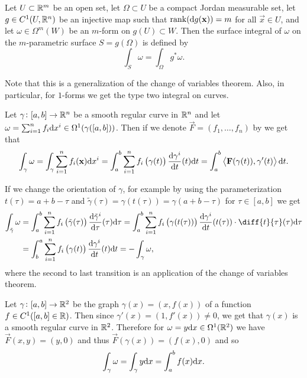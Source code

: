 \documentclass[11pt,a4paper]{article}
\begin{document}
\begin{definition}
  \label{def:surface-integral-m-form}
  Let $U \subset \mathbb{R}^m$ be an open set,
  let $\Omega \subset U$ be a compact Jordan measurable set,
  let $g \in C^1(U,\mathbb{R}^n)$ be an injective map such that $\operatorname{rank}(\mathrm{d} g(\boldsymbol{\mathbf{x}})) = m$ for all $\vec x \in U$,
  and let $\omega \in \Omega^m(W)$ be an $m$-form on
  $g(U) \subset W$.
  Then the surface integral of $\omega$ on the $m$-parametric
  surface $S = g(\Omega)$ is defined by
  \[
    \int_{S} \omega =
    \int_{\Omega} g^*\omega.
  \]
\end{definition}
\begin{remark}
  Note
  that this is a generalization of the change of variables theorem.
  Also, in particular, for $1$-forms we get the type two integral
  on curves.
\end{remark}
\begin{example}
  Let $\gamma \colon [a,b] \to \mathbb{R}^n$ be a smooth regular curve
  in $\mathbb{R}^n$ and let
  $\omega = \sum_{i=1}^{n} f_i \dx^i \in \Omega^1(\gamma([a,b]))$.
  Then if we denote $\vec F = (f_1,\dots,f_n)$
  by  we get that
  \[
    \int_{\gamma} \omega =
    \int_{\gamma} \sum_{i=1}^{n} f_i(\vec x) \dx^i =
    \int_{a}^{b}
    \sum_{i=1}^{n} f_i\del{\gamma(t)} \frac{\dif \gamma^i}{\dt}(t) \dt =
    \int_{a}^{b} \ip{\vec F(\gamma(t))}{\gamma'(t)} \dt.
  \]
\end{example}
\begin{remark}
  If we change the orientation of $\gamma$,
  for example by using the parameterization $t(\tau) = a + b - \tau$
  and $\tilde \gamma(\tau) = \gamma(t(\tau)) = \gamma(a + b - \tau)$
  for $\tau \in [a,b]$ we get
  \begin{align*}
    \int_{\tilde \gamma} \omega &=
    \int_{a}^{b} \sum_{i=1}^{n}
    f_i\del{\tilde \gamma(\tau)} \frac{\dif \tilde \gamma^i}{\dif \tau}(\tau) \dif \tau =
    \int_{a}^{b} \sum_{i=1}^{n}
    f_i\del{\gamma(t(\tau))} \frac{\dif \gamma^i}{\dt}(t(\tau)) \cdot
    \diff{t}{\tau}(\tau) \dif \tau \\ &=
    \int_{b}^{a}
    \sum_{i=1}^{n} f_i\del{\gamma(t)} \frac{\dif \gamma^i}{\dt}(t) \dt =
    -\int_{\gamma} \omega,
  \end{align*}
  where the second to last transition is an application of the 
  change of variables theorem.
\end{remark}

\begin{example}
  Let $\gamma \colon [a,b] \to \mathbb{R}^2$ be the graph
  $\gamma(x) = (x,f(x))$ of a function $f \in C^1([a,b] \in \mathbb{R})$.
  Then since $\gamma'(x) = (1,f'(x)) \neq 0$, we get that
  $\gamma(x)$ is a smooth regular curve in $\mathbb{R}^2$.
  Therefore for $\omega = y \dx \in \Omega^1(\R^2)$ we have
  $\vec F(x,y) = (y,0)$ and thus $\vec F(\gamma(x)) = (f(x),0)$
  and so
  \[
    \int_{\gamma} \omega =
    \int_{\gamma} y \dx =
    \int_{a}^{b} f(x) \dx.
  \]
\end{example}
\end{document}
